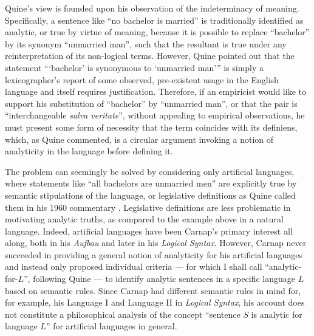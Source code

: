 \documentclass[12pt]{article}
\theoremstyle{plain}
\theoremstyle{definition}
\begin{document}
Quine's view is founded upon his observation of the indeterminacy of meaning. Specifically, a sentence like ``no bachelor is married'' is traditionally identified as analytic, or true by virtue of meaning, because it is possible to replace ``bachelor'' by its synonym ``unmarried man'', such that the resultant is true under any reinterpretation of its non-logical terms. However, Quine pointed out that the statement ```bachelor' is synonymous to `unmarried man''' is simply a lexicographer's report of some observed, pre-existent usage in the English language and itself requires justification. Therefore, if an empiricist would like to support his substitution of ``bachelor'' by ``unmarried man'', or that the pair is ``interchangeable \emph{salva veritate}'', without appealing to empirical observations, he must present some form of necessity that the term coincides with its definiens, which, as Quine commented, is a circular argument invoking a notion of analyticity in the language before defining it.

The problem can seemingly be solved by considering only artificial languages, where statements like ``all bachelors are unmarried men'' are explicitly true by semantic stipulations of the language, or legislative definitions as Quine called them in his 1960 commentary \cite{quine-to-carnap}. Legislative definitions are less problematic in motivating analytic truths, as compared to the example above in a natural language. Indeed, artificial languages have been Carnap's primary interest all along, both in his \emph{Aufbau} and later in his \emph{Logical Syntax}. However, Carnap never succeeded in providing a general notion of analyticity for his artificial languages and instead only proposed individual criteria --- for which I shall call ``analytic-for-$L$'', following Quine --- to identify analytic sentences in a specific language $L$ based on semantic rules. Since Carnap had different semantic rules in mind for, for example, his Language I and Language II in \emph{Logical Syntax}, his account does not constitute a philosophical analysis of the concept ``sentence $S$ is analytic for language $L$'' for artificial languages in general.
\end{document}
